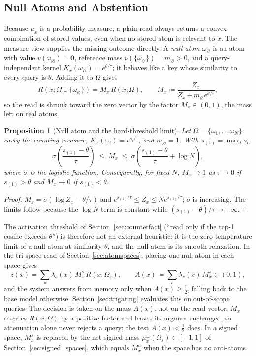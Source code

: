 \documentclass[preprint,12pt]{elsarticle}
\newtheorem{proposition}{Proposition}
\newcommand{\Om}{\Omega}
\newif\ifmarkchanges
\newcommand{\rev}[1]{#1}
\newcommand{\revii}[1]{\ifmarkchanges{\color{blue}#1}\else#1\fi}
\begin{document}
\subsection{Null Atoms and Abstention}
\label{sec:null_atoms}

\rev{Because $\mu_x$ is a probability measure, a plain read always returns a convex combination of stored values, even when no stored atom is relevant to $x$. The measure view supplies the missing outcome directly. A \emph{null atom} $\omega_\varnothing$ is an atom with value $v(\omega_\varnothing)=\mathbf 0$, reference mass $\nu(\{\omega_\varnothing\})=m_\varnothing>0$, and a query-independent kernel $K_x(\omega_\varnothing)=e^{\theta/\tau}$; it behaves like a key whose similarity to every query is $\theta$. Adding it to $\Om$ gives
\[
  R(x;\Om\cup\{\omega_\varnothing\}) = M_x\,R(x;\Om), \qquad
  M_x \coloneqq \frac{Z_x}{Z_x+m_\varnothing e^{\theta/\tau}},
\]
so the read is shrunk toward the zero vector by the factor $M_x\in(0,1)$, the mass left on real atoms.}

\begin{proposition}[Null atom and the hard-threshold limit]
\label{prop:null_atom}
\rev{Let $\Om=\{\omega_1,\dots,\omega_N\}$ carry the counting measure, $K_x(\omega_i)=e^{s_i/\tau}$, and $m_\varnothing=1$. With $s_{(1)}=\max_i s_i$,
\[
  \sigma\!\left(\frac{s_{(1)}-\theta}{\tau}\right) \;\le\; M_x \;\le\; \sigma\!\left(\frac{s_{(1)}-\theta}{\tau}+\log N\right),
\]
where $\sigma$ is the logistic function. Consequently, for fixed $N$, $M_x\to 1$ as $\tau\to 0$ if $s_{(1)}>\theta$ and $M_x\to 0$ if $s_{(1)}<\theta$.}
\end{proposition}

\begin{proof}
\rev{$M_x=\sigma(\log Z_x-\theta/\tau)$ and $e^{s_{(1)}/\tau}\le Z_x\le N e^{s_{(1)}/\tau}$; $\sigma$ is increasing. The limits follow because the $\log N$ term is constant while $(s_{(1)}-\theta)/\tau\to\pm\infty$.} \qedhere
\end{proof}

\rev{The activation threshold of Section~\ref{sec:counterfact} (``read only if the top-1 cosine exceeds $\theta$'') is therefore not an external heuristic: it is the zero-temperature limit of a null atom at similarity $\theta$, and the null atom is its smooth relaxation. In the tri-space read of Section~\ref{sec:atomspaces}, placing one null atom in each space gives
\[
  z(x)=\sum_{s}\lambda_s(x)\,M_{x}^{s}\,R(x;\Om_s), \qquad A(x)\coloneqq\sum_s\lambda_s(x)\,M_x^s\in(0,1),
\]
and the system answers from memory only when $A(x)\ge\tfrac12$, falling back to the base model otherwise. Section~\ref{sec:trigating} evaluates this on out-of-scope queries.} \revii{The decision is taken on the mass $A(x)$, not on the read vector: $M_x$ rescales $R(x;\Om)$ by a positive factor and leaves its argmax unchanged, so attenuation alone never rejects a query; the test $A(x)<\tfrac12$ does. In a signed space, $M_x^s$ is replaced by the net signed mass $\mu_x^{\pm}(\Om_s)\in[-1,1]$ of Section~\ref{sec:signed_spaces}, which equals $M_x^s$ when the space has no anti-atoms.}
\end{document}
